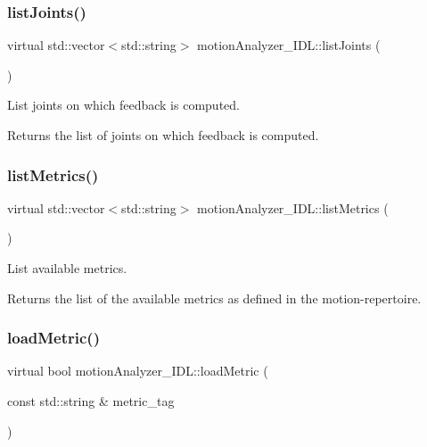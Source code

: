 \subsubsection{\texorpdfstring{listJoints()}{listJoints()}}
{\footnotesize\ttfamily virtual std\+::vector$<$std\+::string$>$ motion\+Analyzer\+\_\+\+I\+D\+L\+::list\+Joints (\begin{DoxyParamCaption}{ }\end{DoxyParamCaption})\hspace{0.3cm}{\ttfamily [virtual]}}



List joints on which feedback is computed. 

\begin{DoxyReturn}{Returns}
the list of joints on which feedback is computed. 
\end{DoxyReturn}
\mbox{\label{classmotionAnalyzer__IDL_a139730029d1e7112eb66636c21fe99c8}} 
\subsubsection{\texorpdfstring{listMetrics()}{listMetrics()}}
{\footnotesize\ttfamily virtual std\+::vector$<$std\+::string$>$ motion\+Analyzer\+\_\+\+I\+D\+L\+::list\+Metrics (\begin{DoxyParamCaption}{ }\end{DoxyParamCaption})\hspace{0.3cm}{\ttfamily [virtual]}}



List available metrics. 

\begin{DoxyReturn}{Returns}
the list of the available metrics as defined in the motion-\/repertoire. 
\end{DoxyReturn}
\mbox{\label{classmotionAnalyzer__IDL_a592816f8515dddcd08fe7e7e87774b16}} 
\subsubsection{\texorpdfstring{loadMetric()}{loadMetric()}}
{\footnotesize\ttfamily virtual bool motion\+Analyzer\+\_\+\+I\+D\+L\+::load\+Metric (\begin{DoxyParamCaption}\item[{const std\+::string \&}]{metric\+\_\+tag }\end{DoxyParamCaption})\hspace{0.3cm}{\ttfamily [virtual]}}



